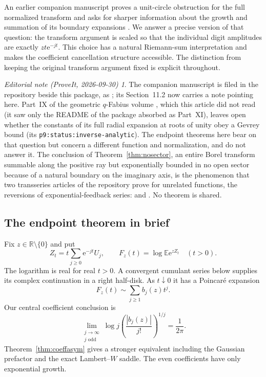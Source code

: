 \documentclass[11pt,a4paper]{article}
\numberwithin{equation}{section}
\theoremstyle{definition}
\theoremstyle{remark}
\newtheorem*{ednote}{Editorial note (ProveIt, 2026-09-30)}
\newcommand{\R}{\mathbb R}
\newcommand{\E}{\mathbb E}
\newcommand{\e}{\mathrm e}
\begin{document}
An earlier companion manuscript proves a unit-circle obstruction for the full normalized transform and asks for sharper information about the growth and summation of its boundary expansions \cite[\S\S7,11.2]{boundary}. We answer a precise version of that question: the transform argument is scaled so that the individual digit amplitudes are exactly $zt\e^{-jt}$. This choice has a natural Riemann-sum interpretation and makes the coefficient cancellation structure accessible. The distinction from keeping the original transform argument fixed is explicit throughout.
\begin{ednote}
The companion manuscript \cite{boundary} is filed in the repository beside
this package, as
;
its Section~11.2 now carries a note pointing here. Part~IX of the geometric
$q$-Fabius volume , which this
article did not read (it saw only the README of the package absorbed as
Part~XI), leaves open whether the constants of its full radial expansion
at roots of unity obey a Gevrey bound (its
\texttt{p9:status:inverse-analytic}). The endpoint theorems here bear on
that question but concern a different function and normalization, and do
not answer it. The conclusion of Theorem~\ref{thm:nosector}, an entire
Borel transform summable along the positive ray but exponentially bounded
in no open sector because of a natural boundary on the imaginary axis, is
the phenomenon that two transseries articles of the repository prove for
unrelated functions, the reversions of exponential-feedback series:
and
.
No theorem is shared.
\end{ednote}

\subsection{The endpoint theorem in brief}
Fix $z\in\R\setminus\{0\}$ and put
\begin{equation}
 Z_t=t\sum_{j\ge0}\e^{-jt}U_j,\qquad
 F_z(t)=\log\E\e^{zZ_t}\quad(t>0).
 \label{eq:mainF}
\end{equation}
The logarithm is real for real $t>0$. A convergent cumulant series below supplies its complex continuation in a right half-disk. As $t\downarrow0$ it has a Poincar\'e expansion
\begin{equation}
 F_z(t)\sim\sum_{j\ge1}b_j(z)t^j.
 \label{eq:formalF}
\end{equation}
Our central coefficient conclusion is
\begin{equation}
 \lim_{\substack{j\to\infty\\j\text{ odd}}}
 \log j\left(\frac{|b_j(z)|}{j!}\right)^{1/j}
 =\frac1{2\pi}.
 \label{eq:introtype}
\end{equation}
Theorem~\ref{thm:coeffasym} gives a stronger equivalent including the Gaussian prefactor and the exact Lambert--$W$ saddle. The even coefficients have only exponential growth.
\end{document}
